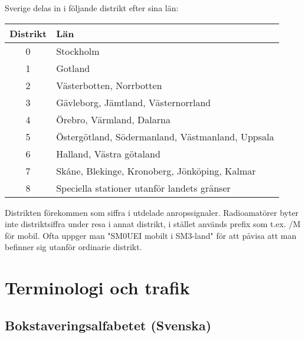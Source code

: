 Sverige delas in i följande distrikt efter sina län:

\begin{center}
\begin{longtable}{cl}
	\textbf{Distrikt} & \textbf{Län}                                     \\ \hline \endhead
	      0        & Stockholm                                        \\
	      1        & Gotland                                          \\
	      2        & Västerbotten, Norrbotten                         \\
	      3        & Gävleborg, Jämtland, Västernorrland              \\
	      4        & Örebro, Värmland, Dalarna                        \\
	      5        & Östergötland, Södermanland, Västmanland, Uppsala \\
	      6        & Halland, Västra götaland                         \\
	      7        & Skåne, Blekinge, Kronoberg, Jönköping, Kalmar    \\
	      8        & Speciella stationer utanför landets gränser
\end{longtable}
\end{center}

Distrikten förekommen som siffra i utdelade anropssignaler. Radioamatörer byter inte distriktsiffra under resa i annat distrikt, i stället används prefix som t.ex. /M för mobil. Ofta uppger man "SM0UEI mobilt i SM3-land" för att påvisa att man befinner sig utanför ordinarie distrikt.

\section{Terminologi och trafik}

\subsection{Bokstaveringsalfabetet (Svenska)}

